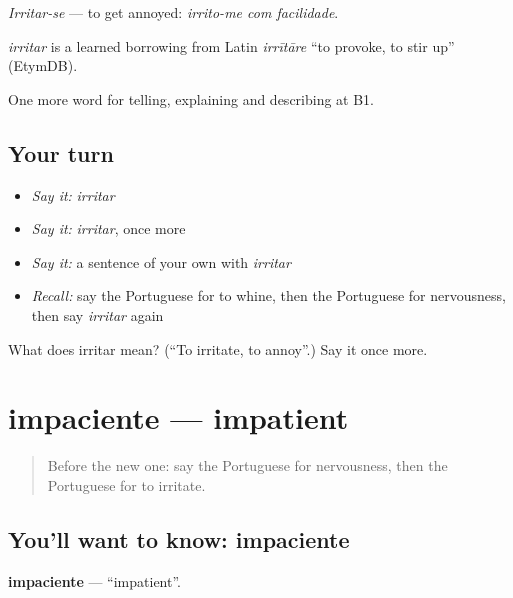 \emph{Irritar-se} — to get annoyed: \emph{irrito-me com facilidade}.

\begin{cousinweb}
\emph{irritar} is a learned borrowing from Latin \emph{irrītāre} \textquotedblleft{}to provoke, to stir up\textquotedblright{} (EtymDB).
\end{cousinweb}

\begin{grammarlens}[title={What you've built}]
One more word for telling, explaining and describing at B1.
\end{grammarlens}

\subsection*{Your turn}
\begin{itemize}
\raggedright
  \item \emph{Say it:} \emph{irritar}
  \item \emph{Say it:} \emph{irritar}, once more
  \item \emph{Say it:} a sentence of your own with \emph{irritar}
  \item \emph{Recall:} say the Portuguese for to whine, then the Portuguese for nervousness, then say \emph{irritar} again
\end{itemize}

\begin{tcolorbox}[breakable,colback=teal!4,colframe=teal!35!black,title={Before you move on}]
What does irritar mean? (\textquotedblleft{}To irritate, to annoy\textquotedblright{}.) Say it once more.
\end{tcolorbox}
\section[impaciente]{impaciente — impatient}

\label{lesson:PT-C475-impaciente}



\begin{quote}
Before the new one: say the Portuguese for nervousness, then the Portuguese for to irritate.
\end{quote}

\subsection*{You'll want to know: impaciente}
\textbf{impaciente} — \textquotedblleft{}impatient\textquotedblright{}.

